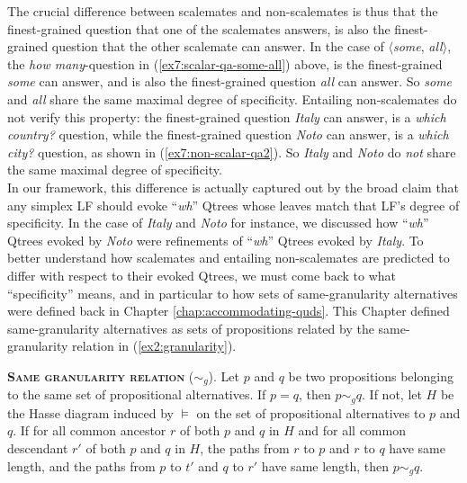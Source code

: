 The crucial difference between scalemates and non-scalemates is thus that the finest-grained question that one of the scalemates answers, is also the finest-grained question that the other scalemate can answer. In the case of $\langle$\textit{some}, \textit{all}$\rangle$, the \textit{how many}-question in (\ref{ex7:scalar-qa-some-all}) above, is the finest-grained \textit{some} can answer, and is also  the finest-grained question \textit{all} can answer. So \textit{some} and \textit{all} share the same maximal degree of specificity. Entailing non-scalemates do not verify this property: the finest-grained question \textit{Italy} can answer, is a \textit{which country?} question, while the finest-grained question \textit{Noto} can answer, is a \textit{which city?} question, as shown in (\ref{ex7:non-scalar-qa2}). So \textit{Italy} and \textit{Noto} do \textit{not} share the same maximal degree of specificity.\\


In our framework, this difference is actually captured out by the broad claim that any simplex LF should evoke  ``\textit{wh}'' Qtrees whose leaves match that LF's degree of specificity. In the case of \textit{Italy} and \textit{Noto} for instance, we discussed how ``\textit{wh}'' Qtrees evoked by \textit{Noto} were refinements of ``\textit{wh}'' Qtrees evoked by \textit{Italy}. To better understand how scalemates and entailing non-scalemates are predicted to differ with respect to their evoked Qtrees, we must come back to what ``specificity'' means, and in particular to how sets of same-granularity alternatives were defined back in Chapter \ref{chap:accommodating-quds}. This Chapter defined same-granularity alternatives as sets of propositions related by the same-granularity relation in (\ref{ex2:granularity}). 

\begin{exe}
	 {\textsc{\textbf{Same granularity relation}} ($\sim_g$). Let $p$ and $q$ be two propositions belonging to the same set of propositional alternatives. If $p=q$, then $p \sim_g q$. If not, let $H$ be the Hasse diagram induced by $\vDash$ on the set of propositional alternatives to $p$ and $q$. If for all common ancestor $r$ of both $p$ and $q$ in $H$ and for all common descendant $r'$ of both $p$ and $q$ in $H$, the paths from $r$ to $p$ and $r$ to $q$ have same length, and the paths from $p$ to $t'$ and $q$ to $r'$ have same length, then $p \sim_g q$.}
\end{exe}


